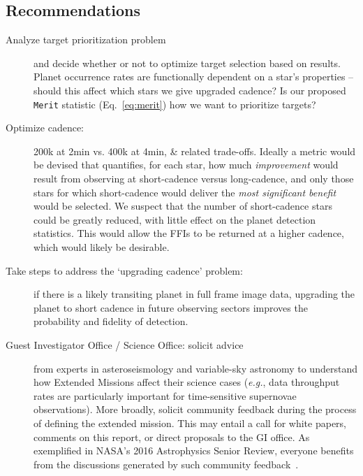 \subsection{Recommendations}
\label{sec:recommendations}
\begin{description}
  
	\item[Analyze target prioritization problem] and decide whether or not to optimize target selection based on results. %
	Planet occurrence rates are functionally dependent on a star's properties -- should this affect which stars we give upgraded cadence?
	Is our proposed \texttt{Merit} statistic (Eq.~\ref{eq:merit}) how we want to prioritize targets?
	
      \item[Optimize cadence:] 200k at 2min vs. 400k at 4min, \&
        related trade-offs.  Ideally a metric would be devised that
        quantifies, for each star, how much {\it improvement} would
        result from observing at short-cadence versus long-cadence,
        and only those stars for which short-cadence would deliver the
        {\it most significant benefit} would be selected.  We suspect
        that the number of short-cadence stars could be greatly
        reduced, with little effect on the planet detection
        statistics. This would allow the FFIs to be returned at a
        higher cadence, which would likely be desirable.
	
	\item[Take steps to address the `upgrading cadence' problem:]
          if there is a likely transiting planet in full frame image
          data, upgrading the planet to short cadence in future
          observing sectors improves the probability and fidelity of
          detection.
	
	\item[Guest Investigator Office / \tess Science Office:
          solicit advice] from experts in asteroseismology and
          variable-sky astronomy to understand how Extended Missions
          affect their science cases (\textit{e.g.}, data throughput
          rates are particularly important for time-sensitive
          supernovae observations).  More broadly, solicit community
          feedback during the process of defining the extended
          mission.  This may entail a call for white papers, comments
          on this report, or direct proposals to the GI office.  As
          exemplified in NASA’s 2016 Astrophysics Senior Review,
          everyone benefits from the discussions generated by such
          community feedback~\citep{donahue_senior_2016}.
	

\end{description}
